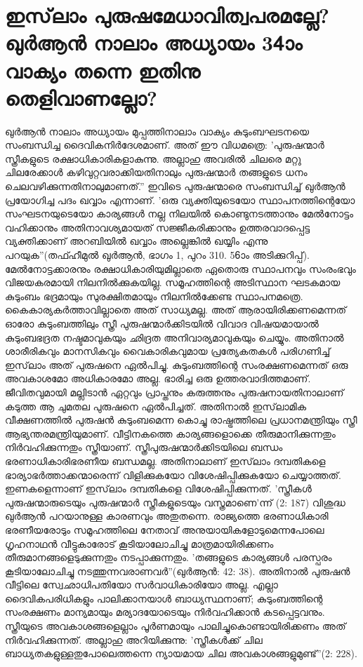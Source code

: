 \section{  ഇസ്‌ലാം പുരുഷമേധാവിത്വപരമല്ലേ? ഖുര്‍ആന്‍ നാലാം അധ്യായം 34ാം വാക്യം തന്നെ ഇതിനു തെളിവാണല്ലോ?}

 ഖുര്‍ആന്‍ നാലാം അധ്യായം മുപ്പത്തിനാലാം വാക്യം കുടുംബഘടനയെ സംബന്ധിച്ച ദൈവികനിര്‍ദേശമാണ്. അത് ഈ വിധമത്രെ: 'പുരുഷന്മാര്‍ സ്ത്രീകളുടെ രക്ഷാധികാരികളാകുന്നു. അല്ലാഹു അവരില്‍ ചിലരെ മറ്റു ചിലരേക്കാള്‍ കഴിവുറ്റവരാക്കിയതിനാലും പുരുഷന്മാര്‍ തങ്ങളുടെ ധനം ചെലവഴിക്കുന്നതിനാലുമാണത്.''
ഇവിടെ പുരുഷന്മാരെ സംബന്ധിച്ച് ഖുര്‍ആന്‍ പ്രയോഗിച്ച പദം ഖവ്വാം എന്നാണ്. 'ഒരു വ്യക്തിയുടെയോ സ്ഥാപനത്തിന്റെയോ സംഘടനയുടെയോ കാര്യങ്ങള്‍ നല്ല നിലയില്‍ കൊണ്ടുനടത്താനും മേല്‍നോട്ടം വഹിക്കാനും അതിനാവശ്യമായത് സജ്ജീകരിക്കാനും ഉത്തരവാദപ്പെട്ട വ്യക്തിക്കാണ് അറബിയില്‍ ഖവ്വാം അല്ലെങ്കില്‍ ഖയ്യിം എന്നു പറയുക''(തഫ്ഹീമുല്‍ ഖുര്‍ആന്‍, ഭാഗം 1, പുറം 310. 56ാം അടിക്കുറിപ്പ്).
മേല്‍നോട്ടക്കാരനും രക്ഷാധികാരിയുമില്ലാതെ ഏതൊരു സ്ഥാപനവും സംരംഭവും വിജയകരമായി നിലനില്‍ക്കുകയില്ല. സമൂഹത്തിന്റെ അടിസ്ഥാന ഘടകമായ കുടുംബം ഭദ്രമായും സുരക്ഷിതമായും നിലനില്‍ക്കേണ്ട സ്ഥാപനമത്രെ. കൈകാര്യകര്‍ത്താവില്ലാതെ അത് സാധ്യമല്ല. അത് ആരായിരിക്കണമെന്നത് ഓരോ കുടുംബത്തിലും സ്ത്രീ പുരുഷന്മാര്‍ക്കിടയില്‍ വിവാദ വിഷയമായാല്‍ കുടുംബഭദ്രത നഷ്ടമാവുകയും ഛിദ്രത അനിവാര്യമാവുകയും ചെയ്യും. അതിനാല്‍ ശാരീരികവും മാനസികവും വൈകാരികവുമായ പ്രത്യേകതകള്‍ പരിഗണിച്ച് ഇസ്‌ലാം അത് പുരുഷനെ ഏല്‍പിച്ചു. കുടുംബത്തിന്റെ സംരക്ഷണമെന്നത് ഒരു അവകാശമോ അധികാരമോ അല്ല. ഭാരിച്ച ഒരു ഉത്തരവാദിത്തമാണ്. ജീവിതവുമായി മല്ലിടാന്‍ ഏറ്റവും പ്രാപ്തനും കരുത്തനും പുരുഷനായതിനാലാണ് കടുത്ത ആ ചുമതല പുരുഷനെ ഏല്‍പിച്ചത്. അതിനാല്‍ ഇസ്‌ലാമിക വീക്ഷണത്തില്‍ പുരുഷന്‍ കുടുംബമെന്ന കൊച്ചു രാഷ്ട്രത്തിലെ പ്രധാനമന്ത്രിയും സ്ത്രീ ആഭ്യന്തരമന്ത്രിയുമാണ്. വീട്ടിനകത്തെ കാര്യങ്ങളൊക്കെ തീരുമാനിക്കുന്നതും നിര്‍വഹിക്കുന്നതും സ്ത്രീയാണ്.
സ്ത്രീപുരുഷന്മാര്‍ക്കിടയിലെ ബന്ധം ഭരണാധികാരിഭരണീയ ബന്ധമല്ല. അതിനാലാണ് ഇസ്‌ലാം ദമ്പതികളെ ഭാര്യാഭര്‍ത്താക്കന്മാരെന്ന് വിളിക്കുകയോ വിശേഷിപ്പിക്കുകയോ ചെയ്യാത്തത്. ഇണകളെന്നാണ് ഇസ്‌ലാം ദമ്പതികളെ വിശേഷിപ്പിക്കുന്നത്. 'സ്ത്രീകള്‍ പുരുഷന്മാരുടെയും പുരുഷന്മാര്‍ സ്ത്രീകളുടെയും വസ്ത്രമാണെ'ന്ന് (2: 187) വിശുദ്ധ ഖുര്‍ആന്‍ പറയാനുള്ള കാരണവും അതുതന്നെ.
രാജ്യത്തെ ഭരണാധികാരി ഭരണീയരോടും സമൂഹത്തിലെ നേതാവ് അനുയായികളോടുമെന്നപോലെ ഗൃഹനാഥന്‍ വീട്ടുകാരോട് കൂടിയാലോചിച്ചു മാത്രമായിരിക്കണം തീരുമാനങ്ങളെടുക്കുന്നതും നടപ്പാക്കുന്നതും. 'തങ്ങളുടെ കാര്യങ്ങള്‍ പരസ്പരം കൂടിയാലോചിച്ചു നടത്തുന്നവരാണവര്‍''(ഖുര്‍ആന്‍: 42: 38).
അതിനാല്‍ പുരുഷന്‍ വീട്ടിലെ സ്വേഛാധിപതിയോ സര്‍വാധികാരിയോ അല്ല. എല്ലാ ദൈവികപരിധികളും പാലിക്കാനയാള്‍ ബാധ്യസ്ഥനാണ്; കുടുംബത്തിന്റെ സംരക്ഷണം മാന്യമായും മര്യാദയോടെയും നിര്‍വഹിക്കാന്‍ കടപ്പെട്ടവനും. സ്ത്രീയുടെ അവകാശങ്ങളെല്ലാം പൂര്‍ണമായും പാലിച്ചുകൊണ്ടായിരിക്കണം അത് നിര്‍വഹിക്കുന്നത്. അല്ലാഹു അറിയിക്കുന്നു: 'സ്ത്രീകള്‍ക്ക് ചില ബാധ്യതകളുള്ളതുപോലെത്തന്നെ ന്യായമായ ചില അവകാശങ്ങളുമുണ്ട്''(2: 228).
